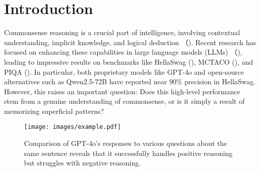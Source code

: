 \section{Introduction}


Commonsense reasoning is a crucial part of intelligence, involving contextual understanding, implicit knowledge, and logical deduction （\citealp{liu2004conceptnet, cambria2011isanette, davis2015commonsense}). Recent research has focused on enhancing these capabilities in large language models (LLMs) （\citealp{yang2024qwen2, openai2024gpt, team2024gemini}), leading to impressive results on benchmarks like HellaSwag (\citealp{zellers2019hellaswag}), MCTACO (\citealp{zhou2019going}), and PIQA (\citealp{bisk2020piqa}). 
In particular, both proprietary models like GPT-4o and open-source alternatives such as Qwen2.5-72B have reported near 90\% precision in HellaSwag. However, this raises an important question: Does this high-level performance stem from a genuine understanding of commonsense, or is it simply a result of memorizing superficial patterns?


\begin{figure}[t]   
\centering
\setlength{\abovecaptionskip}{0.1cm}
\setlength{\belowcaptionskip}{0cm}
\texttt{[image: images/example.pdf]}
\caption{Comparison of GPT-4o's responses to various questions about the same sentence reveals that it successfully handles positive reasoning but struggles with negative reasoning.}
\label{example}
\vspace{-15pt}
\end{figure}

